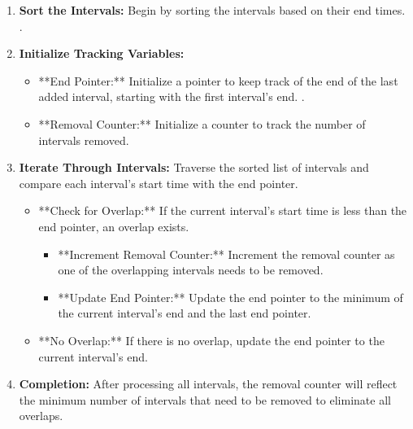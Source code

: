 \begin{enumerate}
    \item \textbf{Sort the Intervals:} Begin by sorting the intervals based on their end times.
    .
    
    \item \textbf{Initialize Tracking Variables:} 
    \begin{itemize}
        \item **End Pointer:** Initialize a pointer to keep track of the end of the last added interval, starting with the first interval's end.
        .
        
        \item **Removal Counter:** Initialize a counter to track the number of intervals removed.
    \end{itemize}
    
    \item \textbf{Iterate Through Intervals:} Traverse the sorted list of intervals and compare each interval's start time with the end pointer.
        \begin{itemize}
            \item **Check for Overlap:** If the current interval's start time is less than the end pointer, an overlap exists.
                \begin{itemize}
                    \item **Increment Removal Counter:** Increment the removal counter as one of the overlapping intervals needs to be removed.
                    
                    \item **Update End Pointer:** Update the end pointer to the minimum of the current interval's end and the last end pointer.
                \end{itemize}
                
            \item **No Overlap:** If there is no overlap, update the end pointer to the current interval's end.
        \end{itemize}
    
    \item \textbf{Completion:} After processing all intervals, the removal counter will reflect the minimum number of intervals that need to be removed to eliminate all overlaps.
\end{enumerate}

